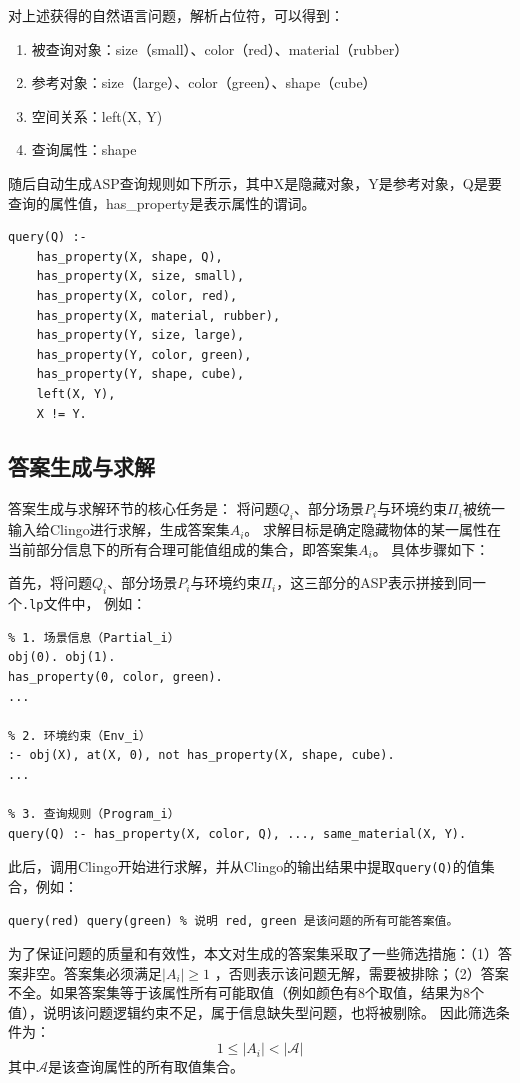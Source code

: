 对上述获得的自然语言问题，解析占位符，可以得到：
\begin{enumerate}[itemsep=0pt,parsep=0pt]
\item 被查询对象：size（small）、color（red）、material（rubber）
\item 参考对象：size（large）、color（green）、shape（cube）
\item 空间关系：left(X, Y)
\item 查询属性：shape
\end{enumerate}

随后自动生成ASP查询规则如下所示，其中X是隐藏对象，Y是参考对象，Q是要查询的属性值，has\_property是表示属性的谓词。
\begin{lstlisting}
query(Q) :-
    has_property(X, shape, Q),
    has_property(X, size, small),
    has_property(X, color, red),
    has_property(X, material, rubber),
    has_property(Y, size, large),
    has_property(Y, color, green),
    has_property(Y, shape, cube),
    left(X, Y),
    X != Y.
\end{lstlisting}

\subsection{答案生成与求解}
答案生成与求解环节的核心任务是：
将问题$Q_i$、部分场景$P_i$与环境约束$\Pi_i$被统一输入给Clingo进行求解，生成答案集$A_i$。
求解目标是确定隐藏物体的某一属性在当前部分信息下的所有合理可能值组成的集合，即答案集$A_i$。
具体步骤如下：

首先，将问题$Q_i$、部分场景$P_i$与环境约束$\Pi_i$，这三部分的ASP表示拼接到同一个\texttt{.lp}文件中，
例如：
\begin{lstlisting}
% 1. 场景信息（Partial_i）
obj(0). obj(1).
has_property(0, color, green).
...

% 2. 环境约束（Env_i）
:- obj(X), at(X, 0), not has_property(X, shape, cube).
...

% 3. 查询规则（Program_i）
query(Q) :- has_property(X, color, Q), ..., same_material(X, Y).
\end{lstlisting}

此后，调用Clingo开始进行求解，并从Clingo的输出结果中提取\texttt{query(Q)}的值集合，例如：
\begin{lstlisting}
query(red) query(green) % 说明 red, green 是该问题的所有可能答案值。
\end{lstlisting}

为了保证问题的质量和有效性，本文对生成的答案集采取了一些筛选措施：（1）答案非空。答案集必须满足$|A_i| \geq 1$
，否则表示该问题无解，需要被排除；（2）答案不全。如果答案集等于该属性所有可能取值（例如颜色有8个取值，结果为8个值），说明该问题逻辑约束不足，属于信息缺失型问题，也将被剔除。
因此筛选条件为：
$$1 \leq |A_i| < |\mathcal{A} |$$
其中$\mathcal{A} $是该查询属性的所有取值集合。

